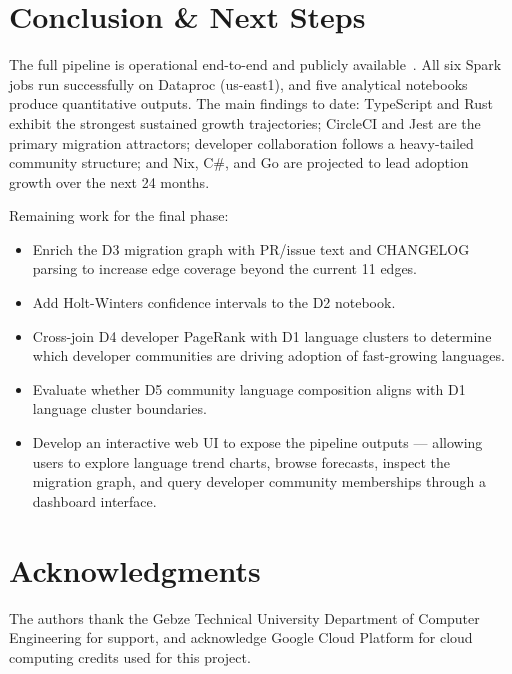 \documentclass[conference]{IEEEtran}
\begin{document}
\section{Conclusion \& Next Steps}

The full pipeline is operational end-to-end and publicly available~\cite{github_repo}. All six Spark jobs run
successfully on Dataproc (us-east1), and five analytical notebooks produce
quantitative outputs. The main findings to date: TypeScript and Rust exhibit
the strongest sustained growth trajectories; CircleCI and Jest are the
primary migration attractors; developer collaboration follows a heavy-tailed
community structure; and Nix, C\#, and Go are projected to lead adoption
growth over the next 24 months.

Remaining work for the final phase:
\begin{itemize}
  \item Enrich the D3 migration graph with PR/issue text and CHANGELOG
        parsing to increase edge coverage beyond the current 11 edges.
  \item Add Holt-Winters confidence intervals to the D2 notebook.
  \item Cross-join D4 developer PageRank with D1 language clusters to
        determine which developer communities are driving adoption of
        fast-growing languages.
  \item Evaluate whether D5 community language composition aligns with
        D1 language cluster boundaries.
  \item Develop an interactive web UI to expose the pipeline outputs —
        allowing users to explore language trend charts, browse forecasts,
        inspect the migration graph, and query developer community
        memberships through a dashboard interface.
\end{itemize}

\section*{Acknowledgments}
The authors thank the Gebze Technical University Department of Computer
Engineering for support, and acknowledge Google Cloud Platform for cloud
computing credits used for this project.
\end{document}
